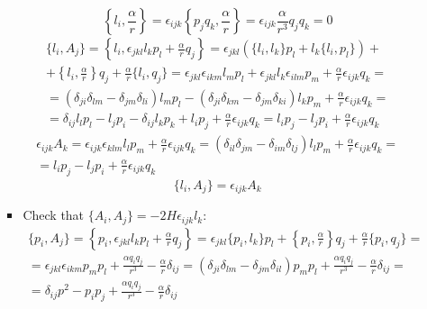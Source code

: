 \documentclass[12pt]{article}
\theoremstyle{definition}
\begin{document}
\begin{enumerate}
\begin{itemize}
\begin{itemize}
\begin{equation}
            \end{equation}
            \begin{equation}
                \left\{l_i,\frac{\alpha}{r}\right\}=\epsilon_{ijk}\left\{p_jq_k,\frac{\alpha}{r}\right\}=\epsilon_{ijk}\frac{\alpha}{r^3} q_jq_k=0
            \end{equation}
            \begin{multline}
                \{l_i,A_j\}=\left\{l_i,\epsilon_{jkl}l_kp_l+\frac{\alpha}{r}q_j\right\}=\epsilon_{jkl}(\{l_i,l_k\}p_l+l_k\{l_i,p_l\})+\\+\left\{l_i,\frac{\alpha}{r}\right\}q_j+\frac{\alpha}{r}\{l_i,q_j\}=\epsilon_{jkl}\epsilon_{ikm}l_mp_l+\epsilon_{jkl}l_k\epsilon_{ilm}p_m+\frac{\alpha}{r}\epsilon_{ijk}q_k=\\=(\delta_{ji}\delta_{lm}-\delta_{jm}\delta_{li})l_mp_l-(\delta_{ji}\delta_{km}-\delta_{jm}\delta_{ki})l_kp_m+\frac{\alpha}{r}\epsilon_{ijk}q_k=\\=\delta_{ij}l_lp_l-l_jp_i-\delta_{ij}l_kp_k+l_ip_j+\frac{\alpha}{r}\epsilon_{ijk}q_k=l_ip_j-l_jp_i+\frac{\alpha}{r}\epsilon_{ijk}q_k
            \end{multline}
            \begin{multline}
                \epsilon_{ijk}A_k=\epsilon_{ijk}\epsilon_{klm}l_lp_m+\frac{\alpha}{r}\epsilon_{ijk}q_k=(\delta_{il}\delta_{jm}-\delta_{im}\delta_{lj})l_lp_m+\frac{\alpha}{r}\epsilon_{ijk}q_k=\\=l_ip_j-l_jp_i+\frac{\alpha}{r}\epsilon_{ijk}q_k
            \end{multline}
            \begin{equation}
                \boxed{\{l_i,A_j\}=\epsilon_{ijk}A_k}
            \end{equation}
            \item Check that $\{A_i,A_j\}=-2H\epsilon_{ijk}l_k$:
            \begin{multline}
                \{p_i,A_j\}=\left\{p_i,\epsilon_{jkl}l_kp_l+\frac{\alpha}{r}q_j\right\}=\epsilon_{jkl}\{p_i,l_k\}p_l+\left\{p_i,\frac{\alpha}{r}\right\}q_j+\frac{\alpha}{r}\{p_i,q_j\}=\\=\epsilon_{jkl}\epsilon_{ikm}p_mp_l+\frac{\alpha q_iq_j}{r^3}-\frac{\alpha}{r}\delta_{ij}=(\delta_{ji}\delta_{lm}-\delta_{jm}\delta_{il})p_mp_l+\frac{\alpha q_iq_j}{r^3}-\frac{\alpha}{r}\delta_{ij}=\\=\delta_{ij}p^2-p_ip_j+\frac{\alpha q_iq_j}{r^3}-\frac{\alpha}{r}\delta_{ij}
            \end{multline}
            \begin{multline}

\end{multline}
\end{itemize}
\end{itemize}
\end{enumerate}
\end{document}

